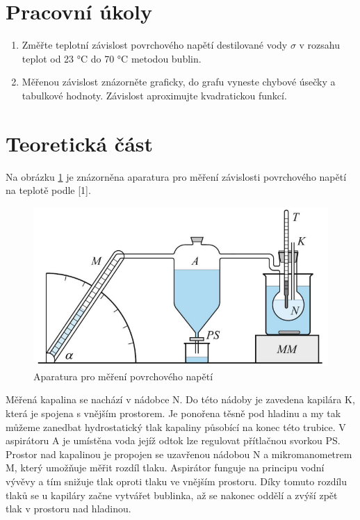 \section{Pracovní úkoly}

\begin{enumerate}
\item Změřte teplotní závislost povrchového napětí destilované vody $\sigma$ v rozsahu teplot od 23 °C do 70 °C metodou bublin.

\item Měřenou závislost znázorněte graficky, do grafu vyneste chybové úsečky a tabulkové hodnoty. Závislost aproximujte kvadratickou funkcí.

\end{enumerate}

\section{Teoretická část}

Na obrázku \ref{fig:aparatura-povrchove-napeti} je znázorněna aparatura pro měření závislosti povrchového napětí na teplotě podle [1].

\begin{figure}[h]
    \centering
    \includegraphics[width=0.75\linewidth]{14 - Studium teplotní závislosti povrchového napětí//Protokol - studium povrchového napětí//img/Aparatura.png}
    \caption{Aparatura pro měření povrchového napětí}
    \label{fig:aparatura-povrchove-napeti}
\end{figure}

Měřená kapalina se nachází v nádobce N. Do této nádoby je zavedena kapilára K, která je spojena s vnějším prostorem. Je ponořena těsně pod hladinu a my tak můžeme zanedbat hydrostatický tlak kapaliny působící na konec této trubice. V aspirátoru A je umístěna voda jejíž odtok lze regulovat přítlačnou svorkou PS. Prostor nad kapalinou je propojen se uzavřenou nádobou N a mikromanometrem M, který umožňuje měřit rozdíl tlaku. Aspirátor funguje na principu vodní vývěvy a tím snižuje tlak oproti tlaku ve vnějším prostoru. Díky tomuto rozdílu tlaků se u kapiláry začne vytvářet bublinka, až se nakonec oddělí a zvýší zpět tlak v prostoru nad hladinou.

